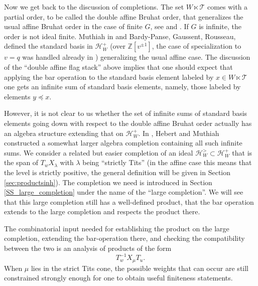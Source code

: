\documentclass{amsart}
\newcommand{\Z}{\mathbb{Z}}
\theoremstyle{definition}
\numberwithin{equation}{section}
\begin{document}
{Now we get back to the discussion of completions. The set $W\ltimes \mathcal{T}$ comes with a partial order, to be called the double affine Bruhat order, that generalizes the usual affine Bruhat order in the case of finite $G$, see \cite{Muthiah_2018} and \cite{Muthiah_Orr}. If $G$ is infinite, the order is not ideal finite. Muthiah  in \cite{Muthiah_2018} and Bardy-Panse, Gaussent, Rousseau, \cite{BPGR} defined the standard basis in $\mathcal{H}_W^+$ (over $\Z[v^{\pm 1}]$,  the case of specialization to $v=q$ was handled already in \cite{Braverman_Kazhdan_Patnaik}) generalizing the usual affine case. The discussion of the ``double affine flag stack'' above implies that one should expect that applying the bar operation to the standard basis element labeled by $x\in W\ltimes \mathcal{T}$ one gets an infinite sum of standard basis elements, namely, those
labeled by elements $y\preceq x$.

However, it is not clear to us whether the set of infinite sums of standard basis elements going down with respect to the double affine Bruhat order actually has an algebra structure extending that on $\mathcal{H}^+_W$. In \cite{HM}, Hebert and Muthiah constructed a somewhat larger algebra completion containing all such infinite sums. We consider a related but easier completion of an ideal  $\mathcal{H}_W^>\subset\mathcal{H}_W^+$ that is the span of $T_w X_\lambda$ with $\lambda$ being ``strictly Tits'' (in the affine case this means that the level is strictly positive, the general definition will be given in Section  \ref{sec:productsinh}). The completion we need is introduced in Section \ref{SS_large_completion} under the name of the ``large completion''. We will see that this large completion still has a well-defined product, that the bar operation extends to the large completion and respects the product there.}


The combinatorial input needed for { establishing the product on the large completion, extending the bar-operation there, and checking the compatibility between the two} is an analysis of products of the form
\[
T_w^{-1}X_\mu T_u.
\]
When $\mu$ lies in the strict Tits cone, the possible weights that can occur are still constrained strongly enough for one to obtain useful finiteness statements.
\end{document}

